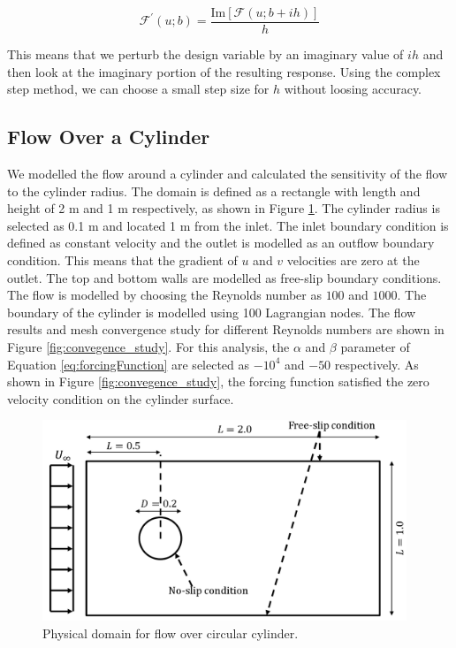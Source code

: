 \documentclass[12pt]{aiaa-pretty}
\begin{document}
%
\begin{equation}\label{eq:compelxStepFormula}
	\mathcal{F}^\prime\left(u; b\right) = \frac{\text{Im}\left[ \mathcal{F}\left(u; b + ih\right) \right]}{h}
\end{equation}
%

This means that we perturb the design variable by an imaginary value of $ih$ and then look at the imaginary portion of the resulting response. Using the complex step method, we can choose a small step size for $h$ without loosing accuracy.

\subsection{Flow Over a Cylinder}
We modelled the flow around a cylinder and calculated the sensitivity of the flow to the cylinder radius. The domain is defined as a rectangle with length and height of 2 m and 1 m respectively, as shown in Figure \ref{fig:cylinderDomain}. The cylinder radius is selected as 0.1 m and located 1 m from the inlet. The inlet boundary condition is defined as constant velocity and the outlet is modelled as an outflow boundary condition. This means that the gradient of $u$ and $v$ velocities are zero at the outlet. The top and bottom walls are modelled as free-slip boundary conditions. The flow is modelled by choosing the Reynolds number as $100$ and $1000$. The boundary of the cylinder is modelled using 100 Lagrangian nodes. The flow results and mesh convergence study for different Reynolds numbers are shown in Figure \ref{fig:convegence_study}. For this analysis, the $\alpha$ and $\beta$ parameter of Equation \eqref{eq:forcingFunction} are selected as $-10^4$ and $-50$ respectively. As shown in Figure \ref{fig:convegence_study}, the forcing function satisfied the zero velocity condition on the cylinder surface.

%
\begin{figure}[H]
	\centering
	\includegraphics[height=6.0cm]{figure/cylinder/domain.png}
	\caption{Physical domain for flow over circular cylinder.}
	\label{fig:cylinderDomain}
\end{figure}
%
\end{document}
